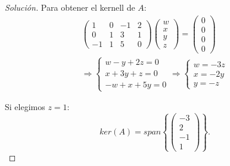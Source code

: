 \documentclass[12pt]{book}
\newenvironment{solution}
  {\renewcommand\qedsymbol{$\square$}\begin{proof}[Solución]}
  {\end{proof}}
\begin{document}
\begin{solution}
Para obtener el kernell de $A$:
\begin{gather*}
    \begin{pmatrix}
    1 & 0 & -1 & 2\\
0 & 1 & 3 & 1\\
-1 & 1 & 5 & 0
\end{pmatrix} \begin{pmatrix}
w\\
x\\
y\\
z
\end{pmatrix} = \begin{pmatrix}
0\\
0\\
0\\
0
\end{pmatrix}\\
\Rightarrow \begin{cases}
w-y+2z=0\\
x+3y+z=0\\
-w+x+5y=0
\end{cases} \Rightarrow \begin{cases}
w=-3z\\
x=-2y\\
y=-z
\end{cases}
\end{gather*}

Si elegimos $z=1$:
\[
ker(A)=span\left\{\begin{pmatrix}
-3\\
2\\
-1\\
1
\end{pmatrix}
\right\}.
\]
\end{solution}
\end{document}
